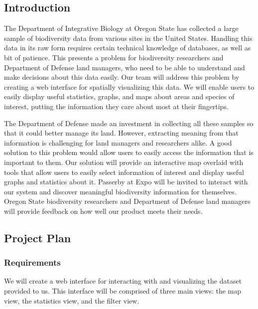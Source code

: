 
\subsection{Introduction}
The Department of Integrative Biology at Oregon State has collected a large sample of biodiversity data from various sites in the United States.
Handling this data in its raw form requires certain technical knowledge of databases, as well as bit of patience.
This presents a problem for biodiversity researchers and Department of Defense land managers, who need to be able to understand and make decisions about this data easily.
Our team will address this problem by creating a web interface for spatially visualizing this data.
We will enable users to easily display useful statistics, graphs, and maps about areas and species of interest, putting the information they care about most at their fingertips.

The Department of Defense made an investment in collecting all these samples so that it could better manage its land.
However, extracting meaning from that information is challenging for land managers and researchers alike.
A good solution to this problem would allow users to easily access the information that is important to them.
Our solution will provide an interactive map overlaid with tools that allow users to easily select information of interest and display useful graphs and statistics about it.
Passerby at Expo will be invited to interact with our system and discover meaningful biodiversity information for themselves.
Oregon State biodiversity researchers and Department of Defense land managers will provide feedback on how well our product meets their needs.

\subsection{Project Plan}

\subsubsection{Requirements}
We will create a web interface for interacting with and visualizing the dataset provided to us.
This interface will be comprised of three main views: the map view, the statistics view, and the filter view.

